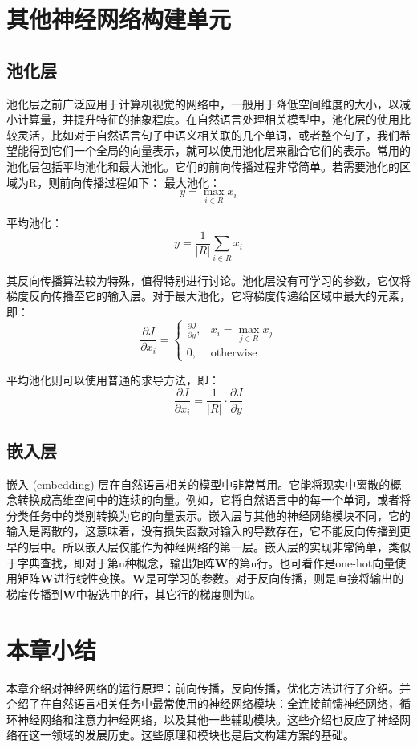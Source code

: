 \section{其他神经网络构建单元}

\subsection{池化层}

池化层之前广泛应用于计算机视觉的网络中，一般用于降低空间维度的大小，以减小计算量，并提升特征的抽象程度。在自然语言处理相关模型中，池化层的使用比较灵活，比如对于自然语言句子中语义相关联的几个单词，或者整个句子，我们希望能得到它们一个全局的向量表示，就可以使用池化层来融合它们的表示。常用的池化层包括平均池化和最大池化。它们的前向传播过程非常简单。若需要池化的区域为R，则前向传播过程如下：
最大池化：
\begin{equation}
    y=\max_{i\in R}{x_i}
\end{equation}

平均池化：
\begin{equation}
    y=\frac{1}{\left|R\right|}\sum_{i\in R}x_i
\end{equation}

其反向传播算法较为特殊，值得特别进行讨论。池化层没有可学习的参数，它仅将梯度反向传播至它的输入层。对于最大池化，它将梯度传递给区域中最大的元素，即：
\begin{equation}
    \frac{\partial J}{\partial x_i}=\begin{cases}
        \frac{\partial J}{\partial y}, & x_i=\max_{j\in R}{x_j}\\
        0, & \mathrm{otherwise}
    \end{cases}
\end{equation}

平均池化则可以使用普通的求导方法，即：
\begin{equation}
    \frac{\partial J}{\partial x_i}=\frac{1}{\left|R\right|}\cdot\frac{\partial J}{\partial y}
\end{equation}

\subsection{嵌入层}

嵌入 (embedding) 层在自然语言相关的模型中非常常用。它能将现实中离散的概念转换成高维空间中的连续的向量。例如，它将自然语言中的每一个单词，或者将分类任务中的类别转换为它的向量表示。嵌入层与其他的神经网络模块不同，它的输入是离散的，这意味着，没有损失函数对输入的导数存在，它不能反向传播到更早的层中。所以嵌入层仅能作为神经网络的第一层。嵌入层的实现非常简单，类似于字典查找，即对于第n种概念，输出矩阵$\bm{W}$的第n行。也可看作是one-hot向量使用矩阵$\bm{W}$进行线性变换。$\bm{W}$是可学习的参数。对于反向传播，则是直接将输出的梯度传播到$\bm{W}$中被选中的行，其它行的梯度则为0。

\section{本章小结}

本章介绍对神经网络的运行原理：前向传播，反向传播，优化方法进行了介绍。并介绍了在自然语言相关任务中最常使用的神经网络模块：全连接前馈神经网络，循环神经网络和注意力神经网络，以及其他一些辅助模块。这些介绍也反应了神经网络在这一领域的发展历史。这些原理和模块也是后文构建方案的基础。
